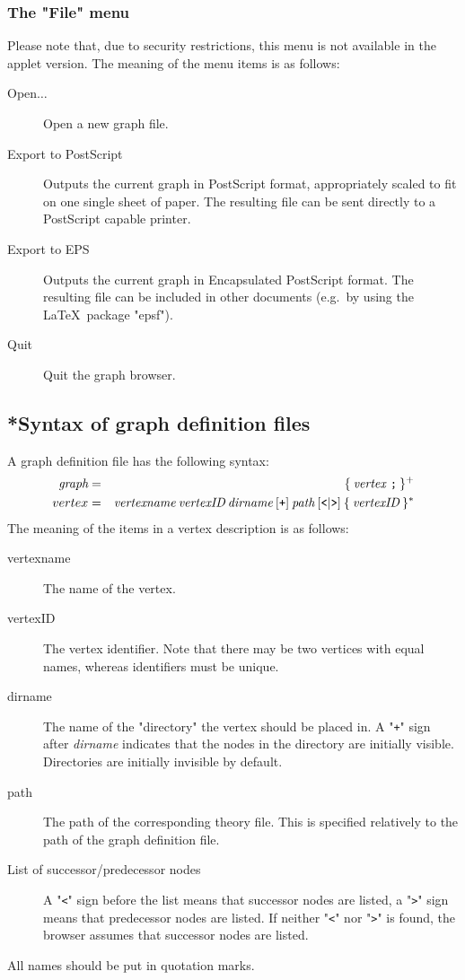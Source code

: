 \subsubsection*{The "File" menu}
Please note that, due to security restrictions, this menu is not available
in the applet version. The meaning of the menu items is as follows:
\begin{description}
\item[Open$\ldots$] Open a new graph file.
\item[Export to PostScript] Outputs the current graph in {\sc PostScript}
format, appropriately scaled to fit on one single sheet of paper.
The resulting file can be sent directly to a {\sc PostScript} capable printer.
\item[Export to EPS] Outputs the current graph in Encapsulated {\sc PostScript}
format. The resulting file can be included in other documents (e.g.~by using
the \LaTeX \ package "epsf").
\item[Quit] Quit the graph browser.
\end{description}

\subsection*{*Syntax of graph definition files}
A graph definition file has the following syntax:
\begin{eqnarray*}
\mbox{\it graph} & = & \{ \: \mbox{\it vertex \tt ;} \: \} ^ + \\
vertex & = & \mbox{\it vertexname} \: \mbox{\it vertexID} \: \mbox{\it dirname} \: [ \mbox{\tt +} ]
\: \mbox{\it path} \: [ \mbox{\tt <} | \mbox{\tt >} ] \: \{ \: \mbox{\it vertexID} \: \} ^ *
\end{eqnarray*}
The meaning of the items in a vertex description is as follows:
\begin{description}
\item[vertexname] The name of the vertex.
\item[vertexID] The vertex identifier. Note that there may be two vertices with equal names,
whereas identifiers must be unique.
\item[dirname] The name of the "directory" the vertex should be placed in.
A "{\tt +}" sign after {\it dirname} indicates that the nodes in the directory
are initially visible. Directories are initially invisible by default.
\item[path] The path of the corresponding theory file. This is specified
relatively to the path of the graph definition file.
\item[List of successor/predecessor nodes] A "{\tt <}" sign before the list
means that successor nodes are listed, a "{\tt >}" sign means that predecessor
nodes are listed. If neither "{\tt <}" nor "{\tt >}" is found, the browser
assumes that successor nodes are listed.
\end{description}
All names should be put in quotation marks.
